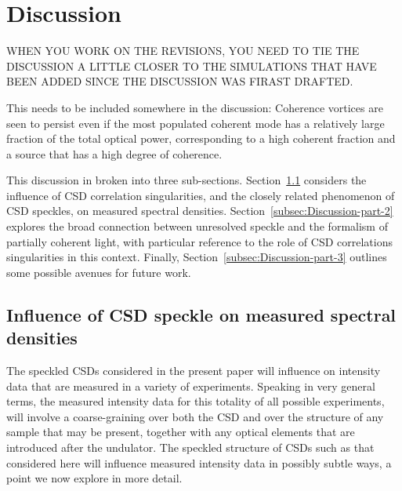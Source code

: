 \documentclass{iucr}              %
\newcommand{\inblue}[1]{{\color{blue}#1}}
\begin{document}
%
%

% 
% 
% 
% 
% 


\section{Discussion}

WHEN YOU WORK ON THE REVISIONS, YOU NEED TO TIE THE DISCUSSION A  LITTLE CLOSER TO THE SIMULATIONS THAT HAVE BEEN ADDED SINCE THE DISCUSSION WAS FIRAST DRAFTED.

{\color{red} This needs to be included somewhere in the discussion: Coherence vortices are seen to persist even if the most populated coherent mode has a relatively large fraction of the total optical power, corresponding to a high coherent fraction and a source that has a high degree of coherence.}

This discussion in broken into three sub-sections.  Section~\ref{subsec:Discussion-part-1} considers the influence of CSD correlation singularities, and the closely related phenomenon of CSD speckles, on measured spectral densities.  Section~\ref{subsec:Discussion-part-2} explores the broad connection between unresolved speckle and the formalism of partially coherent light, with particular reference to the role of CSD correlations singularities in this context.  Finally, Section~\ref{subsec:Discussion-part-3} outlines some possible avenues for future work.  

\subsection{Influence of CSD speckle on measured spectral densities}\label{subsec:Discussion-part-1}

The speckled CSDs considered in the present paper will influence on intensity data that are measured in a variety of experiments.  Speaking in very general terms, the measured intensity data for this totality of all possible experiments, will involve a coarse-graining over both the CSD and over the structure of any sample that may be present, together with any optical elements that are introduced after the undulator.  The speckled structure of CSDs such as that considered here will influence measured intensity data in possibly subtle ways, a point we now explore in more detail.  
\end{document}
